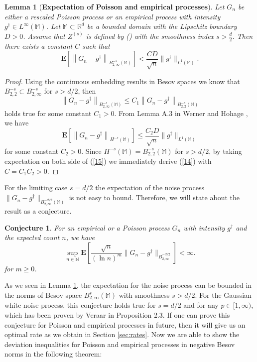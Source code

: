 \documentclass[10pt]{iopart}
\newtheorem{lemma}[theorem]{Lemma}
\newtheorem{conjecture}[theorem]{Conjecture}
\begin{document}
\begin{lemma}[{\bf Expectation of Poisson and empirical processes}]\label{Lemma-3.2}
Let $G_{n}$ be either a rescaled Poisson process or an empirical process with intensity $g^{\dagger}\in L^{\infty}(\mathbb{M})$. 
Let $\mathbb{M}\subset\mathbb{R}^{d}$ be a bounded domain with the Lipschitz boundary $D>0$. 
Assume that $Z^{(s)}$ is defined by () with the smoothness index $s>\frac{d}{2}$. Then there exists a constant $C$ such that
\begin{equation}\label{14}
\mathbf{E}\left[\left\|G_{n}-g^{\dagger}\right\|_{B_{2, \infty}^{-s}(\mathbb{M})}\right]<\frac{CD}{\sqrt{n}}
\|g^{\dagger}\|_{L^{1}(\mathbb{M})}.
\end{equation} 
\end{lemma}

\begin{proof}
Using the continuous embedding results in Besov spaces we know that $B_{2, 2}^{-s}\subset B_{2, \infty}^{-s}$ for $s>d/2$, then 
\begin{equation}\label{15}
\left\|G_{n}-g^{\dagger}\right\|_{B_{2, \infty}^{-s}(\mathbb{M})}\leq C_{1}\left\|G_{n}-g^{\dagger}\right\|_{B_{2, 2}^{-s}(\mathbb{M})}
\end{equation}
holds true for some constant $C_{1}>0$. From Lemma A.3 in Werner and Hohage \cite{Werner2012}, we have
\begin{equation*}
\mathbf{E}\left[\left\|G_{n}-g^{\dagger}\right\|_{H^{-s}(\mathbb{M})}\right]\leq \frac{C_{2}D}{\sqrt{n}}\|g^{\dagger}\|_{L^{1}(\mathbb{M})}
\end{equation*}
for some constant $C_{2}>0$. Since $H^{-s}(\mathbb{M})=B_{2, 2}^{-s}(\mathbb{M})$ for $s>d/2$, by taking expectation on both 
side of (\ref{15}) we immediately derive (\ref{14}) with $C=C_{1}C_{2}>0$.
\end{proof}

For the limiting case $s=d/2$ the expectation of the noise process $\|G_{n}-g^{\dagger}\|_{B_{2, \infty}^{-d/2}(\mathbb{M})}$ is not easy to bound.
Therefore, we will state about the result as a conjecture. 

\begin{conjecture}\label{Conjecture-3.3}
For an empirical or a Poisson process $G_{n}$ with intensity $g^{\dagger}$ and the expected count $n$, we have
\begin{equation}\label{*}
\sup_{n\in\mathbb{N}}\mathbf{E}\left[\frac{\sqrt{n}}{(\ln n)^{m}}\|G_{n}-g^{\dagger}\|_{B_{2, \infty}^{-d/2}}\right]<\infty.
\end{equation}
for $m\geq 0$.
\end{conjecture}
As we seen in Lemma \ref{Lemma-3.2}, the expectation for the noise process can be bounded in the norms of Besov space
$B_{2, \infty}^{s}(\mathbb{M})$ with smoothness $s>d/2$.  For the Gaussian white noise process, this conjecture holds true for
$s=d/2$ and for any $p\in[1, \infty)$, which has been proven by Veraar \cite{Veraar2011} in Proposition 2.3. If one can prove this conjecture
for Poisson and empirical processes in future, then it will give us an optimal rate as we obtain in Section \ref{sec:rates}. Now we are able to
show the deviation inequalities for Poisson and empirical processes in negative Besov norms in the following theorem: 
\end{document}
